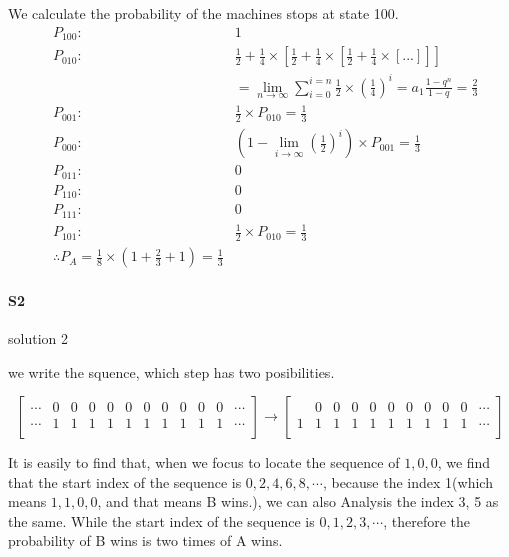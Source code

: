 \documentclass[UTF8]{../09-Mathematics}
\begin{document}
  We calculate the probability of the machines stops at state 100.
\begin{equation}
\begin{aligned}
    &P_{100}:&1 \\
    &P_{010}:&\frac{1}{2} + \frac{1}{4} \times [ \frac{1}{2} + \frac{1}{4} \times [ \frac{1}{2} + \frac{1}{4} \times [ ... ] ] ]\\
    & & =\lim_{n \to \infty}\sum_{i=0}^{i=n}\frac{1}{2} \times (\frac{1}{4})^i=a_1\frac{1-q^n}{1-q}=\frac{2}{3} \\
    &P_{001}:&\frac{1}{2}  \times P_{010} = \frac{1}{3}  \\
    &P_{000}:&(1- \lim_{i \to \infty}(\frac{1}{2})^i) \times P_{001} = \frac{1}{3}\\
    &P_{011}:&0 \\
    &P_{110}:&0 \\
    &P_{111}:&0 \\
    &P_{101}:&\frac{1}{2}  \times P_{010} = \frac{1}{3}  \\
    &\therefore P_{A} = \frac{1}{8} \times (1 + \frac{2}{3} + 1 ) = \frac{1}{3} 
\end{aligned}
\end{equation}


\paragraph{S2} solution 2


we write the squence, which step has two posibilities. 
\addtocounter{MaxMatrixCols}{10}
\begin{equation}
    \begin{bmatrix}
\cdots & 0 & 0 & 0 & 0& 0& 0& 0& 0& 0& 0 & \cdots \\
\cdots & 1 & 1& 1& 1& 1& 1& 1& 1& 1& 1&\cdots \\
     \end{bmatrix}
     \longrightarrow
    \begin{bmatrix}
          & 0 & 0 & 0& 0& 0& 0& 0& 0& 0 & \cdots \\
         1 & 1& 1& 1& 1& 1& 1& 1& 1& 1&\cdots \\
    \end{bmatrix}
\end{equation}

It is easily to find that, when we focus to locate the sequence of ${1,0,0}$, we find that the start index of the sequence is ${0, 2,4,6,8, \cdots}$, because the index 1(which means $1,1,0,0$, and that means B wins.), we can also Analysis the index 3, 5 as the same. While the start index of the sequence is ${0,1, 2,3, \cdots}$, therefore the probability of B wins is two times of A wins.
\end{document}

